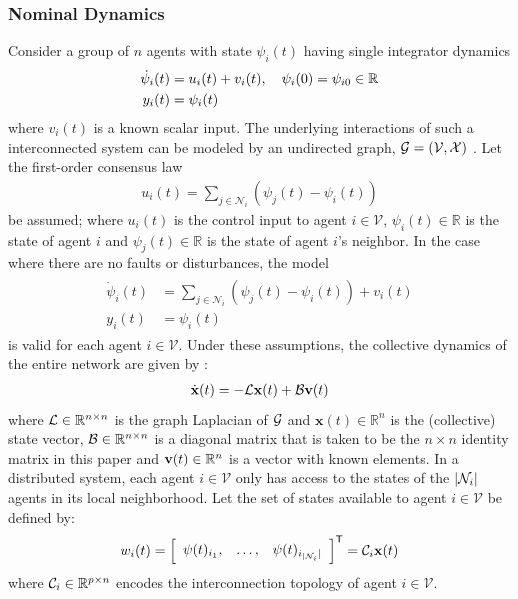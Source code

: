 \documentclass[letterpaper, 11 pt, conference]{ieeeconf}  %
\begin{document}
\subsubsection{Nominal Dynamics} Consider a group of $n$ agents with state $\psi_i(t)$ having single integrator dynamics 
\begin{gather} 
\begin{aligned}
\dot{\psi}_i(t) &= u_i(t) + v_i(t), \quad \psi_i (0) = \psi_{i0} \in \mathbb{R} \nonumber \\
y_i(t) &= \psi_i (t) \nonumber
\end{aligned}
\end{gather}
where $v_i(t)$ is a known scalar input. The underlying interactions of such a interconnected system can be modeled by an undirected graph, $\mathcal{G} = (\mathcal{V},\mathcal{X})$ \cite{olfati-saber_consensus_2007}. Let the first-order consensus law 
\begin{align}
u_i(t) = \sum_{j \in \mathcal{N}_i} (\psi_j(t) - \psi_i(t)) \nonumber
\end{align}
be assumed; where $u_i(t)$ is the control input to agent $i \in \mathcal{V}$, $\psi_i(t) \in \mathbb{R}$ is the state of agent $i$ and $\psi_j(t) \in \mathbb{R}$ is the state of agent $i$'s neighbor. In the case where there are no faults or disturbances, the model 
\begin{gather} 
\begin{aligned} \label{eq:agentCons}
\dot{\psi}_i(t) &= \sum_{j \in \mathcal{N}_i} (\psi_j(t) - \psi_i(t)) +v_i (t) \\
y_i(t) &= \psi_i(t) \nonumber
\end{aligned}
\end{gather}
is valid for each agent $i \in \mathcal{V}$. Under these assumptions, the collective dynamics of the entire network are given by \cite{olfati-saber_consensus_2007}:
\begin{align} \label{eq:eq4}
\dot{\mathbf{x}}(t) =-\mathcal{L}\mathbf{x}(t) + \mathcal{B} \mathbf{v} (t)
\end{align}
where $\mathcal{L} \in \mathbb{R}^{n \times n}$ is the graph Laplacian of $\mathcal{G}$ and $\mathbf{x}(t) \in \mathbb{R}^n$ is the (collective) state vector, $\mathcal{B} \in \mathbb{R}^{n \times n}$ is a diagonal matrix that is taken to be the $n \times n$ identity matrix in this paper and $\mathbf{v}(t) \in \mathbb{R}^n$ is a vector with known elements. In a distributed system, each agent $i \in \mathcal{V}$ only has access to the states of the $|\mathcal{N}_i|$ agents in its local neighborhood. Let the set of states available to agent $i \in \mathcal{V}$ be defined by:
\begin{align} \label{eq:eq5}
w_i(t) = \left [ \begin{array}{ccc} \psi(t)_{i_1},&\ldots,&\psi(t)_{i_{|\mathcal{N}_i}|} \end{array}\right ]^{\mathsf{T}} = \mathcal{C}_i \mathbf{x}(t) 
\end{align}
where $\mathcal{C}_i \in \mathbb{R}^{p \times n}$ encodes the interconnection topology of agent $i \in \mathcal{V}$. 
\end{document}
